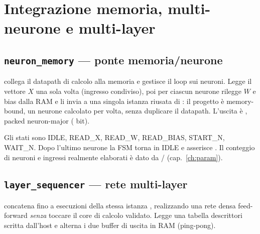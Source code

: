 \chapter[Memoria, multi-neurone e multi-layer]{Integrazione memoria, multi-neurone e multi-layer}
\label{ch:seq}

\section{\texttt{neuron\_memory} --- ponte memoria/neurone}
 collega il datapath di calcolo alla memoria e gestisce il loop sui
neuroni. Legge il vettore $X$ una sola volta (ingresso condiviso), poi per ciascun
neurone rilegge $W$ e bias dalla RAM e li invia a una singola istanza riusata di
: il progetto è memory-bound, un neurone calcolato per volta,
senza duplicare il datapath. L'uscita è , packed neuron-major
( bit).

\begin{center}
\end{center}

Gli stati sono IDLE, READ\_X, READ\_W, READ\_BIAS, START\_N, WAIT\_N. Dopo l'ultimo
neurone la FSM torna in IDLE e asserisce . Il conteggio di neuroni e ingressi
realmente elaborati è dato da /
(cap.~\ref{ch:param}).

\section{\texttt{layer\_sequencer} --- rete multi-layer}
 concatena fino a  esecuzioni della stessa
istanza , realizzando una rete densa feed-forward \emph{senza}
toccare il core di calcolo validato. Legge una tabella descrittori scritta dall'host e
alterna i due buffer di uscita in RAM (ping-pong).

